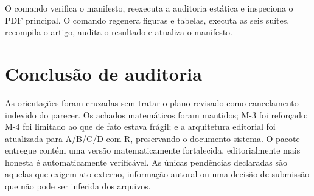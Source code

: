 \documentclass[11pt,a4paper]{article}
\begin{document}
O comando  verifica o manifesto, reexecuta a auditoria estática e
inspeciona o PDF principal. O comando  regenera figuras e tabelas,
executa as seis suítes, recompila o artigo, audita o resultado e atualiza o manifesto.

\section{Conclusão de auditoria}

As orientações foram cruzadas sem tratar o plano revisado como cancelamento indevido do
parecer. Os achados matemáticos foram mantidos; M-3 foi reforçado; M-4 foi limitado ao
que de fato estava frágil; e a arquitetura editorial foi atualizada para A/B/C/D com R,
preservando o documento-sistema. O pacote entregue contém uma versão matematicamente
fortalecida, editorialmente mais honesta é automaticamente verificável. As únicas
pendências declaradas são aquelas que exigem ato externo, informação autoral ou uma
decisão de submissão que não pode ser inferida dos arquivos.
\end{document}
